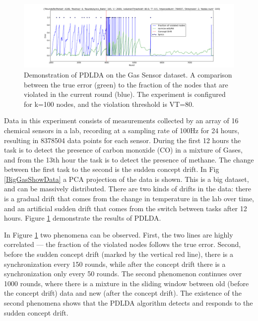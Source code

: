 \documentclass{sig-alternate-05-2015}
\begin{document}
\begin{figure}[ht!]
\centering
\includegraphics[width=\textwidth]{BigGas/overTime100k.png}
\caption{Demonstration of PDLDA on the Gas Sensor dataset. 
A comparison between the true error (green) to the fraction of the nodes that 
are violated in the current round (blue). 
The experiment is configured for k=100 nodes, and the violation threshold is
VT=80.}
\label{BigGasOverTime}
\end{figure}
Data in this experiment \cite{bigGas} consists of measurements collected
by an array of 16 chemical sensors in a lab, recording at a sampling
rate of 100Hz for 24 hours, resulting in 8378504 data points for each sensor. 
During the first 12 hours the task is to detect the presence of carbon monoxide
(CO) in a mixture of Gases, and from the 13th hour the task is to detect the presence of methane. 
The change between the first task to the second is the sudden concept drift.
In Fig \ref{BigGasShowData} a PCA projection of the data is shown.
This is a big dataset, and can be massively distributed. 
There are two kinds of drifts in the data: there is a gradual drift that comes from 
the change in temperature in the lab over time, and an
artificial sudden drift that comes from the switch between tasks after 12 hours.
Figure \ref{BigGasOverTime} demonstrate the results of PDLDA.

In Figure \ref{BigGasOverTime} two phenomena can be observed.
First, the two lines are highly correlated --- the fraction of the violated
nodes follows the true error. Second,  before the sudden concept drift 
(marked by the vertical red line), there is a synchronization every 150 rounds, while 
after the concept drift there is a synchronization only every 50 rounds.
The second phenomenon continues over 1000 rounds, where there is a mixture in the 
sliding window between old (before the concept drift) data and new 
(after the concept drift). The existence of the second phenomena shows that
the PDLDA algorithm detects and responds to the sudden concept drift.
\end{document}
